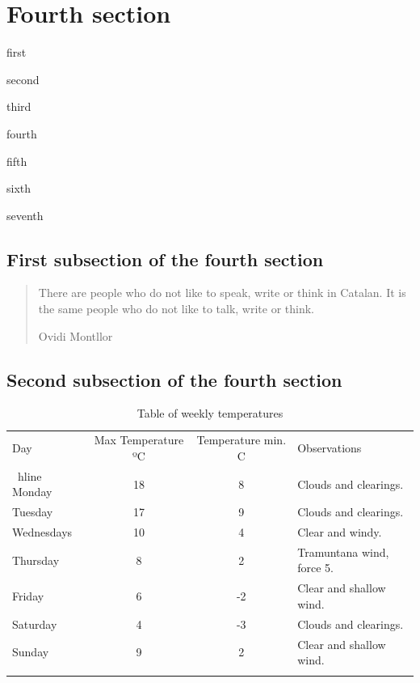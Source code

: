 \documentclass[a4paper,
                             twoside,
                             BCOR1.0cm,
                             DIV11,
                             parskip=full,
                             11pt]{scrbook}
\let\shline\hline
\def\hline{\noalign{\vskip3pt}\shline\noalign{\vskip4pt}}
\begin{document}
\section{Fourth section}\label{sec:fourth}
\lipsum[1]
\begin{steps}
\item  first
\item  second
\item  third
\item  fourth
\item  fifth
\item  sixth
\item  seventh
\end{steps}
\subsection{First subsection of the fourth section}\label{sbsec:first}
\lipsum[1-3]
\begin{quote}
There are people who do not like to speak, write or think in Catalan. It is the same people who do not like to talk, write or think.

Ovidi Montllor
\end{quote}
\subsection{Second subsection of the fourth section}\label{sbsec:second}
\lipsum[4-5]
\begin{table}[h]
\centering\scriptsize
\begin{tabular}{l|c|c|l}
\hline
Day & Max Temperature ºC & Temperature min. C & Observations \\
\ hline
Monday & 18 & 8 & Clouds and clearings. \\
Tuesday & 17 & 9 & Clouds and clearings. \\
Wednesdays & 10 & 4 & Clear and windy. \\
Thursday & 8 & 2 & Tramuntana wind, force 5. \\
Friday & 6 & -2 & Clear and shallow wind. \\
Saturday & 4 & -3 & Clouds and clearings. \\
Sunday & 9 & 2 & Clear and shallow wind. \\
\hline
\end{tabular}
\caption{Table of weekly temperatures}\label{tab:temp2}
\end{table}
\lipsum[8-9]
\end{document}
